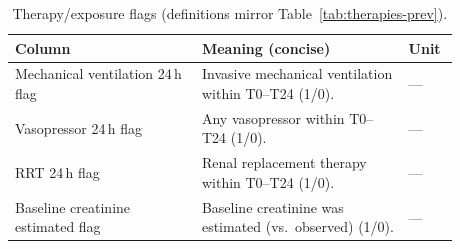 \vspace{0.75\baselineskip}
\begin{table}[t]\centering
{\small\renewcommand{\arraystretch}{1.12}\setlength{\tabcolsep}{6pt}%
\caption{Therapy/exposure flags (definitions mirror Table~\ref{tab:therapies-prev}).}
\label{app:tab-therapies}
\begin{tabular}{P{0.38\linewidth} P{0.42\linewidth} P{0.08\linewidth}}
\toprule
\textbf{Column} & \textbf{Meaning (concise)} & \textbf{Unit}\\
\midrule
Mechanical ventilation 24\,h flag & Invasive mechanical ventilation within T0--T24 (1/0). & ---\\
Vasopressor 24\,h flag & Any vasopressor within T0--T24 (1/0). & ---\\
RRT 24\,h flag & Renal replacement therapy within T0--T24 (1/0). & ---\\
Baseline creatinine estimated flag & Baseline creatinine was estimated (vs.\ observed) (1/0). & ---\\
\bottomrule
\end{tabular}}
\end{table}

